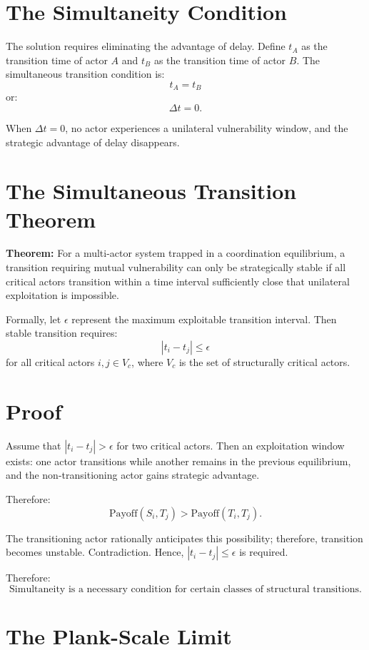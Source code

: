 \documentclass[11pt,openany]{book}
\theoremstyle{plain}
\theoremstyle{definition}
\begin{document}
\section*{The Simultaneity Condition}

The solution requires eliminating the advantage of delay. Define \(t_A\) as the transition time of actor \(A\) and \(t_B\) as the transition time of actor \(B\). The simultaneous transition condition is:
\[
\boxed{
t_A = t_B
}
\]
or:
\[
\boxed{
\Delta t = 0.
}
\]

When \(\Delta t = 0\), no actor experiences a unilateral vulnerability window, and the strategic advantage of delay disappears.

\section*{The Simultaneous Transition Theorem}

\textbf{Theorem:} For a multi-actor system trapped in a coordination equilibrium, a transition requiring mutual vulnerability can only be strategically stable if all critical actors transition within a time interval sufficiently close that unilateral exploitation is impossible.

Formally, let \(\epsilon\) represent the maximum exploitable transition interval. Then stable transition requires:
\[
|t_i - t_j| \leq \epsilon
\]
for all critical actors \(i, j \in V_c\), where \(V_c\) is the set of structurally critical actors.

\section*{Proof}

Assume that \(|t_i - t_j| > \epsilon\) for two critical actors. Then an exploitation window exists: one actor transitions while another remains in the previous equilibrium, and the non-transitioning actor gains strategic advantage. 

Therefore:
\[
\text{Payoff}(S_i, T_j) > \text{Payoff}(T_i, T_j).
\]

The transitioning actor rationally anticipates this possibility; therefore, transition becomes unstable. Contradiction. Hence, \(|t_i - t_j| \leq \epsilon\) is required. 

Therefore:
\[
\boxed{
\text{Simultaneity is a necessary condition for certain classes of structural transitions.}
}
\]

\section*{The Plank-Scale Limit}
\end{document}
